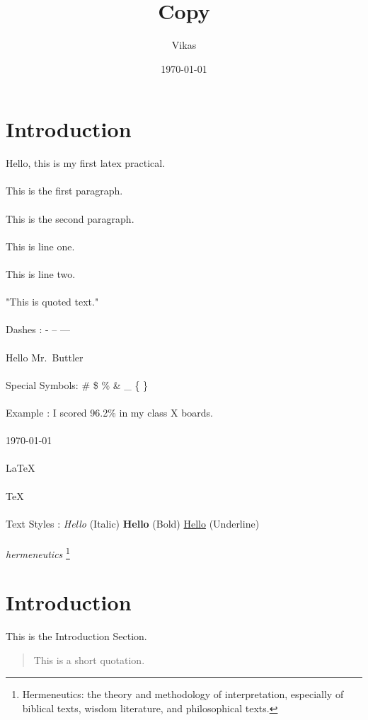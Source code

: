 \documentclass{article}
\title{Copy}
\author{Vikas}
\date{\today}
\begin{document}
\maketitle

\section{Introduction}
Hello, this is my first latex practical.
\\ \\
This is the first paragraph.
\\ \\
This is the second paragraph.
\\ \\
This is line one.
\\ \\
This is line two.
\\ \\
"This is quoted text."
\\ \\
 Dashes : 
 - %
 -- %
 --- %
\\ \\
Hello Mr.\ Buttler %
\\ \\
Special Symbols: \#  \$  \%  \&  \_  \{  \}  \~
\\ \\
Example : 
I scored 96.2\% in my class X boards.
\\ \\
 \today        %
 \\ \\
 \LaTeX        %
 \\ \\
 \TeX          %
\\ \\
Text Styles : 
\textit{Hello}       %
(Italic)
\textbf{Hello}      %
(Bold)
\underline{Hello}   %
(Underline)
\\ \\
\textit{hermeneutics}  %
\footnote{Hermeneutics: the theory and methodology of interpretation, especially of biblical texts, wisdom literature, and philosophical texts.}
\section{Introduction}
This is the Introduction Section.
\begin{quote}
    This is a short quotation.
\end{quote}
\end{document}
